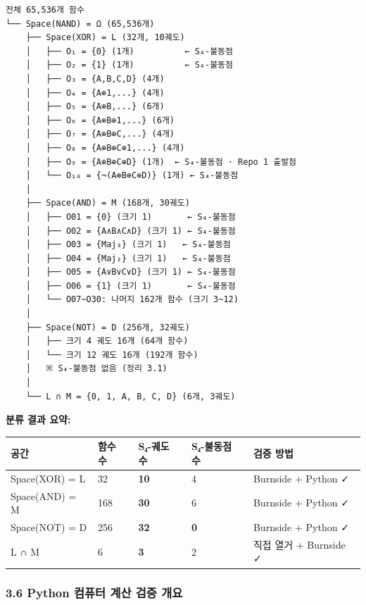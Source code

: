 \documentclass[
]{article}
\newcounter{none} %
\begin{document}
\begin{verbatim}
전체 65,536개 함수
└── Space(NAND) = Ω (65,536개)
    ├── Space(XOR) = L (32개, 10궤도)
    │   ├── O₁ = {0} (1개)          ← S₄-불동점
    │   ├── O₂ = {1} (1개)          ← S₄-불동점
    │   ├── O₃ = {A,B,C,D} (4개)
    │   ├── O₄ = {A⊕1,...} (4개)
    │   ├── O₅ = {A⊕B,...} (6개)
    │   ├── O₆ = {A⊕B⊕1,...} (6개)
    │   ├── O₇ = {A⊕B⊕C,...} (4개)
    │   ├── O₈ = {A⊕B⊕C⊕1,...} (4개)
    │   ├── O₉ = {A⊕B⊕C⊕D} (1개)  ← S₄-불동점 · Repo 1 출발점
    │   └── O₁₀ = {¬(A⊕B⊕C⊕D)} (1개) ← S₄-불동점
    │
    ├── Space(AND) = M (168개, 30궤도)
    │   ├── O01 = {0} (크기 1)       ← S₄-불동점
    │   ├── O02 = {A∧B∧C∧D} (크기 1) ← S₄-불동점
    │   ├── O03 = {Maj₃} (크기 1)   ← S₄-불동점
    │   ├── O04 = {Maj₂} (크기 1)   ← S₄-불동점
    │   ├── O05 = {A∨B∨C∨D} (크기 1) ← S₄-불동점
    │   ├── O06 = {1} (크기 1)       ← S₄-불동점
    │   └── O07~O30: 나머지 162개 함수 (크기 3~12)
    │
    ├── Space(NOT) = D (256개, 32궤도)
    │   ├── 크기 4 궤도 16개 (64개 함수)
    │   └── 크기 12 궤도 16개 (192개 함수)
    │   ※ S₄-불동점 없음 (정리 3.1)
    │
    └── L ∩ M = {0, 1, A, B, C, D} (6개, 3궤도)
\end{verbatim}

\textbf{분류 결과 요약:}

{\def\LTcaptype{none} %
\begin{longtable}[]{@{}lllll@{}}
\toprule\noalign{}
공간 & 함수 수 & S₄-궤도 수 & S₄-불동점 수 & 검증 방법 \\
\midrule\noalign{}
\endhead
\bottomrule\noalign{}
\endlastfoot
Space(XOR) = L & 32 & \textbf{10} & 4 & Burnside + Python ✓ \\
Space(AND) = M & 168 & \textbf{30} & 6 & Burnside + Python ✓ \\
Space(NOT) = D & 256 & \textbf{32} & \textbf{0} & Burnside + Python ✓ \\
L ∩ M & 6 & \textbf{3} & 2 & 직접 열거 + Burnside ✓ \\
\end{longtable}
}

\subsubsection{3.6 Python 컴퓨터 계산 검증
개요}\label{python-uxcef4uxd4e8uxd130-uxacc4uxc0b0-uxac80uxc99d-uxac1cuxc694}
\end{document}
